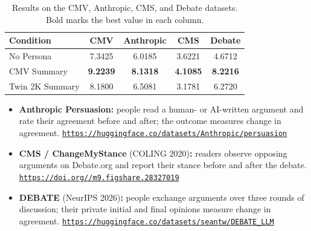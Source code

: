 \begin{table}[H]
\centering
\caption{Results on the CMV, Anthropic, CMS, and Debate datasets. Bold marks the best value in each column.}
\label{tab:additional-datasets}
\small
\begin{tabular}{lcccc}
\toprule
\textbf{Condition} & \textbf{CMV} & \textbf{Anthropic} & \textbf{CMS} & \textbf{Debate} \\
\midrule
No Persona & 7.3425 & 6.0185 & 3.6221 & 4.6712 \\
CMV Summary & \textbf{9.2239} & \textbf{8.1318} & \textbf{4.1085} & \textbf{8.2216} \\
Twin 2K Summary & 8.1800 & 6.5081 & 3.1781 & 6.2720 \\
\bottomrule
\end{tabular}
\par\smallskip
\begin{minipage}{0.96\textwidth}\footnotesize\raggedright
\begin{itemize}\setlength{\itemsep}{1pt}\setlength{\topsep}{2pt}\setlength{\parsep}{0pt}
\item \textbf{Anthropic Persuasion:} people read a human- or AI-written argument and rate their agreement before and after; the outcome measures change in agreement. \href{https://huggingface.co/datasets/Anthropic/persuasion}{\texttt{https://huggingface.co/\allowbreak datasets/\allowbreak Anthropic/\allowbreak persuasion}}
\item \textbf{CMS / ChangeMyStance} (COLING 2020)\textbf{:} readers observe opposing arguments on Debate.org and report their stance before and after the debate. \href{https://doi.org/10.6084/m9.figshare.28327019}{\texttt{https://doi.org//\allowbreak m9.figshare.28327019}}
\item \textbf{DEBATE} (NeurIPS 2026)\textbf{:} people exchange arguments over three rounds of discussion; their private initial and final opinions measure change in agreement. \href{https://huggingface.co/datasets/seantw/DEBATE_LLM}{\texttt{https://huggingface.co/\allowbreak datasets/\allowbreak seantw/\allowbreak DEBATE\_LLM}}
\end{itemize}
\end{minipage}
\end{table}

